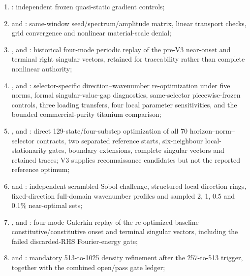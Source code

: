 \begin{enumerate}
\item {}: independent frozen quasi-static gradient controls;
\item {} and : same-window seed/spectrum/amplitude matrix, linear transport checks, grid convergence and nonlinear material-scale denial;
\item {},  and : historical four-mode periodic replay of the pre-V3 near-onset and terminal right singular vectors, retained for traceability rather than complete nonlinear authority;
\item {},  and : selector-specific direction--wavenumber re-optimization under five norms, formal singular-value-gap diagnostics, same-selector piecewise-frozen controls, three loading transfers, four local parameter sensitivities, and the bounded commercial-purity titanium comparison;
\item {},  and : direct 129-state/four-substep optimization of all 70 horizon--norm--selector contracts, two separated reference starts, six-neighbour local-stationarity gates, boundary extensions, complete singular vectors and retained traces; V3 supplies reconnaissance candidates but not the reported reference optimum;
\item {} and : independent scrambled-Sobol challenge, structured local direction rings, fixed-direction full-domain wavenumber profiles and sampled 2, 1, 0.5 and 0.1\% near-optimal sets;
\item {},  and : four-mode Galerkin replay of the re-optimized baseline constitutive/constitutive onset and terminal singular vectors, including the failed discarded-RHS Fourier-energy gate;
\item {} and : mandatory 513-to-1025 density refinement after the 257-to-513 trigger, together with the combined open/pass gate ledger;

\end{enumerate}

